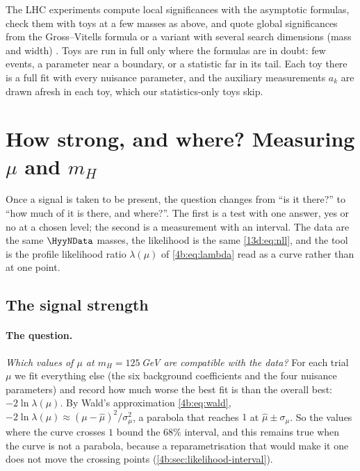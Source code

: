 \begin{inpractice}
The LHC experiments compute local significances with the asymptotic formulas, check them
with toys at a few masses as above, and quote global significances from the
Gross--Vitells formula or a variant with several search dimensions (mass and width)
\cite{GrossVitells2010,Cowan2011}. Toys are run in full only where the formulas are in
doubt: few events, a parameter near a boundary, or a statistic far in its tail. Each toy
there is a full fit with every nuisance parameter, and the auxiliary measurements $a_k$
are drawn afresh in each toy, which our statistics-only toys skip.
\end{inpractice}
\section{How strong, and where? Measuring $\mu$ and $m_H$}
\label{13d:sec:measure}

Once a signal is taken to be present, the question changes from ``is it there?'' to ``how
much of it is there, and where?''. The first is a test with one answer, yes or no at a
chosen level; the second is a measurement with an interval. The data are the same
$\HyyNData$ masses, the likelihood is the same \eqref{13d:eq:nll}, and the tool is the
profile likelihood ratio $\lambda(\mu)$ of \eqref{4b:eq:lambda} read as a curve rather
than at one point.

\subsection{The signal strength}
\label{13d:sec:mu}

\paragraph{The question.}
\emph{Which values of $\mu$ at $m_H=125\,$GeV are compatible with the data?} For each
trial $\mu$ we fit everything else (the six background coefficients and the four
nuisance parameters) and record how much worse the best fit is than the overall best:
$-2\ln\lambda(\mu)$. By Wald's approximation \eqref{4b:eq:wald},
$-2\ln\lambda(\mu)\approx(\mu-\hat\mu)^2/\sigma_\mu^2$, a parabola that reaches $1$ at
$\hat\mu\pm\sigma_\mu$. So the values where the curve crosses $1$ bound the $68\%$
interval, and this remains true when the curve is not a parabola, because a
reparametrisation that would make it one does not move the crossing points
(\cref{4b:sec:likelihood-interval}).

